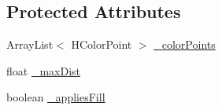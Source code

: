 \subsection*{Protected Attributes}
\begin{DoxyCompactItemize}
\item 
Array\-List$<$ H\-Color\-Point $>$ \hyperlink{classhype_1_1colorist_1_1_h_color_field_a3405873de28ef44d2f8bce4770202048}{\-\_\-color\-Points}
\item 
float \hyperlink{classhype_1_1colorist_1_1_h_color_field_a49741a866fdcc404a396cb387d04b7eb}{\-\_\-max\-Dist}
\item 
boolean \hyperlink{classhype_1_1colorist_1_1_h_color_field_ade8032b9b41ab7a1d2cd62b43c890167}{\-\_\-applies\-Fill}
\end{DoxyCompactItemize}


